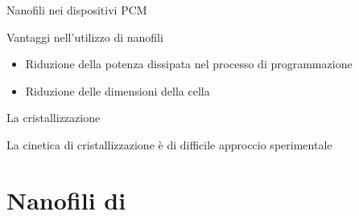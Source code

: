 \documentclass{beamer}
\begin{document}
\begin{frame}{Nanofili nei dispositivi PCM}
 \begin{exampleblock}{Vantaggi nell'utilizzo di nanofili}
  \begin{itemize}
   \item<1-> Riduzione della potenza dissipata nel processo di programmazione
   \item<2-> Riduzione delle dimensioni della cella 
  \end{itemize}
\end{exampleblock}
\end{frame}


\begin{frame}{La cristallizzazione}
 \begin{alertblock}{}
  La cinetica di cristallizzazione è di difficile approccio sperimentale 
 \end{alertblock}

\end{frame}



\section{Nanofili di \gete}
\end{document}
